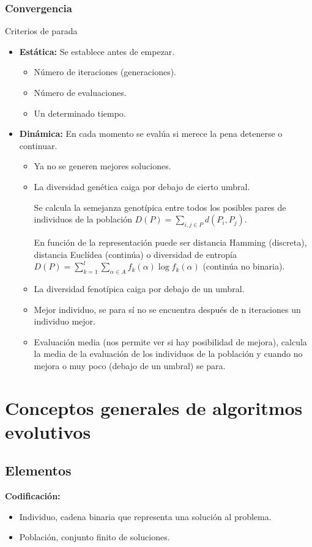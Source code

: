 \documentclass[12pt, twoside, openright]{report} %
\begin{document}
\subsection{Convergencia}
Criterios de parada
\begin{itemize}
	\item \textbf{Estática:} Se establece antes de empezar.
	      \begin{itemize}
		      \item Número de iteraciones (generaciones).
		      \item Número de evaluaciones.
		      \item Un determinado tiempo.
	      \end{itemize}
	\item \textbf{Dinámica:} En cada momento se evalúa si merece la pena detenerse o continuar.
	      \begin{itemize}
		      \item Ya no se generen mejores soluciones.
		      \item La diversidad genética caiga por debajo de cierto umbral.

		            Se calcula la semejanza genotípica entre todos los posibles pares de individuos de la población $D(P)=\sum_{i,j\in P} d(P_i, P_j)$.

		            En función de la representación puede ser distancia Hamming (discreta), distancia Euclídea (continúa) o diversidad de entropía $D(P)=\sum_{k=1}^l\sum_{\alpha \in A} f_k(\alpha)\log f_k(\alpha)$ (continúa no binaria).
		      \item La diversidad fenotípica caiga por debajo de un umbral.
		      \item Mejor individuo, se para sí no se encuentra después de n iteraciones un individuo mejor.
		      \item Evaluación media (nos permite ver si hay posibilidad de mejora), calcula la media de la evaluación de los individuos de la población y cuando no mejora o muy poco (debajo de un umbral) se para.
	      \end{itemize}
\end{itemize}

\chapter{Conceptos generales de algoritmos evolutivos}
\section{Elementos}
\textbf{Codificación:}
\begin{itemize}
	\item Individuo, cadena binaria que representa una solución al problema.
	\item Población, conjunto finito de soluciones.
\end{itemize}
\end{document}
